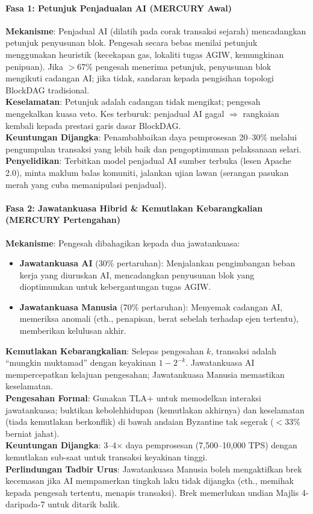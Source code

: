 \documentclass[11pt]{article}
\begin{document}
\paragraph{Fasa 1: Petunjuk Penjadualan AI (MERCURY Awal)}
\textbf{Mekanisme}: Penjadual AI (dilatih pada corak transaksi sejarah) mencadangkan petunjuk penyusunan blok. Pengesah secara bebas menilai petunjuk menggunakan heuristik (kecekapan gas, lokaliti tugas AGIW, kemungkinan penipuan). Jika $>67\%$ pengesah menerima petunjuk, penyusunan blok mengikuti cadangan AI; jika tidak, sandaran kepada pengisihan topologi BlockDAG tradisional.\\
\textbf{Keselamatan}: Petunjuk adalah cadangan tidak mengikat; pengesah mengekalkan kuasa veto. Kes terburuk: penjadual AI gagal $\Rightarrow$ rangkaian kembali kepada prestasi garis dasar BlockDAG.\\
\textbf{Keuntungan Dijangka}: Penambahbaikan daya pemprosesan 20--30\% melalui pengumpulan transaksi yang lebih baik dan pengoptimuman pelaksanaan selari.\\
\textbf{Penyelidikan}: Terbitkan model penjadual AI sumber terbuka (lesen Apache 2.0), minta maklum balas komuniti, jalankan ujian lawan (serangan pasukan merah yang cuba memanipulasi penjadual).

\paragraph{Fasa 2: Jawatankuasa Hibrid \& Kemutlakan Kebarangkalian (MERCURY Pertengahan)}
\textbf{Mekanisme}: Pengesah dibahagikan kepada dua jawatankuasa:
\begin{itemize}[noitemsep]
  \item \textbf{Jawatankuasa AI} (30\% pertaruhan): Menjalankan pengimbangan beban kerja yang diuruskan AI, mencadangkan penyusunan blok yang dioptimumkan untuk kebergantungan tugas AGIW.
  \item \textbf{Jawatankuasa Manusia} (70\% pertaruhan): Menyemak cadangan AI, memeriksa anomali (cth., penapisan, berat sebelah terhadap ejen tertentu), memberikan kelulusan akhir.
\end{itemize}
\textbf{Kemutlakan Kebarangkalian}: Selepas pengesahan $k$, transaksi adalah ``mungkin muktamad'' dengan keyakinan $1 - 2^{-k}$. Jawatankuasa AI mempercepatkan kelajuan pengesahan; Jawatankuasa Manusia memastikan keselamatan.\\
\textbf{Pengesahan Formal}: Gunakan TLA+ untuk memodelkan interaksi jawatankuasa; buktikan kebolehhidupan (kemutlakan akhirnya) dan keselamatan (tiada kemutlakan berkonflik) di bawah andaian Byzantine tak segerak ($<33\%$ berniat jahat).\\
\textbf{Keuntungan Dijangka}: 3--4$\times$ daya pemprosesan (7,500--10,000 TPS) dengan kemutlakan sub-saat untuk transaksi keyakinan tinggi.\\
\textbf{Perlindungan Tadbir Urus}: Jawatankuasa Manusia boleh mengaktifkan brek kecemasan jika AI mempamerkan tingkah laku tidak dijangka (cth., memihak kepada pengesah tertentu, menapis transaksi). Brek memerlukan undian Majlis 4-daripada-7 untuk ditarik balik.
\end{document}
